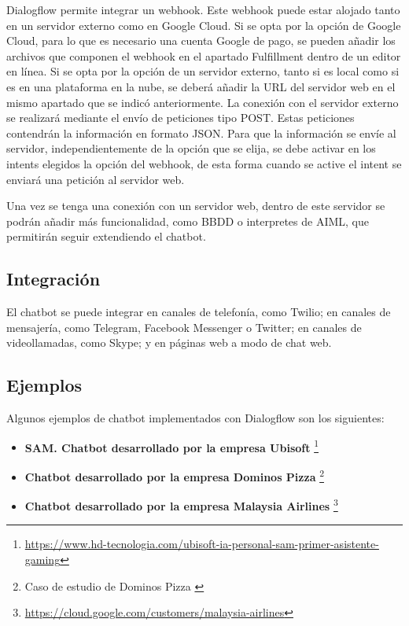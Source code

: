 Dialogflow permite integrar un \gls{webhook}. Este \gls{webhook} puede estar alojado tanto en un servidor externo como en Google Cloud. Si se opta por la opción de Google Cloud, para lo que es necesario una cuenta Google de pago, se pueden añadir los archivos que componen el \gls{webhook} en el apartado Fulfillment dentro de un editor en línea. Si se opta por la opción de un servidor externo, tanto si es local como si es en una plataforma en la nube, se deberá añadir la URL del servidor web en el mismo apartado que se indicó anteriormente. La conexión con el servidor externo se realizará mediante el envío de peticiones tipo POST. Estas peticiones contendrán la información en formato JSON. Para que la información se envíe al servidor, independientemente de la opción que se elija, se debe activar en los intents elegidos la opción del \gls{webhook}, de esta forma cuando se active el intent se enviará una petición al servidor web.

Una vez se tenga una conexión con un servidor web, dentro de este servidor se podrán añadir más funcionalidad, como BBDD o interpretes de AIML, que permitirán seguir extendiendo el chatbot.

\subsection*{Integración}

El chatbot se puede integrar en canales de telefonía, como Twilio; en canales de mensajería, como Telegram, Facebook Messenger o Twitter; en canales de videollamadas, como Skype; y en páginas web a modo de chat web.

\subsection*{Ejemplos}

Algunos ejemplos de chatbot implementados con Dialogflow son los siguientes:

\begin{itemize}
\item \textbf{SAM. Chatbot desarrollado por la empresa Ubisoft} \footnote{\url{https://www.hd-tecnologia.com/ubisoft-ia-personal-sam-primer-asistente-gaming}}
\item \textbf{Chatbot desarrollado por la empresa Dominos Pizza} \footnote{Caso de estudio de Dominos Pizza \cite{RefWorks:RefID:10-domino's-case-study}}
\item \textbf{Chatbot desarrollado por la empresa Malaysia Airlines} \footnote{\url{https://cloud.google.com/customers/malaysia-airlines}}
\end{itemize}


